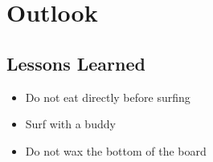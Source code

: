 \chapter{Outlook}

\section{Lessons Learned}

\begin{itemize}
  \item Do not eat directly before surfing
  \item Surf with a buddy
  \item Do not wax the bottom of the board

\end{itemize}
